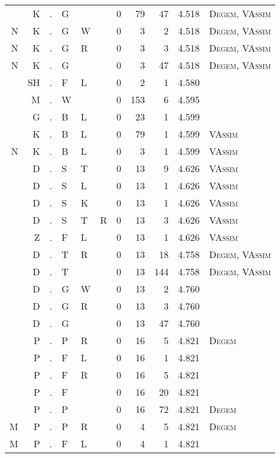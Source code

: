 \begin{longtable}{r@{ } r@{ } c@{ } l@{ } l@{ } l@{ } r r r r l }
  & K & . & G &   &   & 0 & 79 & 47 & 4.518 & \textsc{Degem}, \textsc{VAssim} \\
N & K & . & G & W &   & 0 & 3 & 2 & 4.518 & \textsc{Degem}, \textsc{VAssim} \\
N & K & . & G & R &   & 0 & 3 & 3 & 4.518 & \textsc{Degem}, \textsc{VAssim} \\
N & K & . & G &   &   & 0 & 3 & 47 & 4.518 & \textsc{Degem}, \textsc{VAssim} \\
  & SH & . & F & L &   & 0 & 2 & 1 & 4.580 &  \\
  & M & . & W &   &   & 0 & 153 & 6 & 4.595 &  \\
  & G & . & B & L &   & 0 & 23 & 1 & 4.599 &  \\
  & K & . & B & L &   & 0 & 79 & 1 & 4.599 & \textsc{VAssim} \\
N & K & . & B & L &   & 0 & 3 & 1 & 4.599 & \textsc{VAssim} \\
  & D & . & S & T &   & 0 & 13 & 9 & 4.626 & \textsc{VAssim} \\
  & D & . & S & L &   & 0 & 13 & 1 & 4.626 & \textsc{VAssim} \\
  & D & . & S & K &   & 0 & 13 & 1 & 4.626 & \textsc{VAssim} \\
  & D & . & S & T & R & 0 & 13 & 3 & 4.626 & \textsc{VAssim} \\
  & Z & . & F & L &   & 0 & 13 & 1 & 4.626 & \textsc{VAssim} \\
  & D & . & T & R &   & 0 & 13 & 18 & 4.758 & \textsc{Degem}, \textsc{VAssim} \\
  & D & . & T &   &   & 0 & 13 & 144 & 4.758 & \textsc{Degem}, \textsc{VAssim} \\
  & D & . & G & W &   & 0 & 13 & 2 & 4.760 &  \\
  & D & . & G & R &   & 0 & 13 & 3 & 4.760 &  \\
  & D & . & G &   &   & 0 & 13 & 47 & 4.760 &  \\
  & P & . & P & R &   & 0 & 16 & 5 & 4.821 & \textsc{Degem} \\
  & P & . & F & L &   & 0 & 16 & 1 & 4.821 &  \\
  & P & . & F & R &   & 0 & 16 & 5 & 4.821 &  \\
  & P & . & F &   &   & 0 & 16 & 20 & 4.821 &  \\
  & P & . & P &   &   & 0 & 16 & 72 & 4.821 & \textsc{Degem} \\
M & P & . & P & R &   & 0 & 4 & 5 & 4.821 & \textsc{Degem} \\
M & P & . & F & L &   & 0 & 4 & 1 & 4.821 &  \\

\end{longtable}
